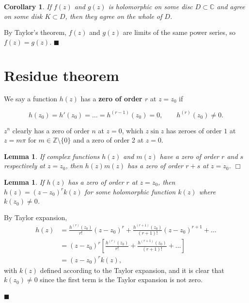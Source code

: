 \documentclass[letter-paper]{tufte-book}
\newtheorem{lemma}[theorem]{\color{pastel-blue}Lemma}
\newtheorem{corollary}[theorem]{\color{pastel-blue}Corollary}
\newenvironment{proof}[1][Proof]{\begin{trivlist}
\item[\hskip \labelsep {\bfseries #1}]}{\end{trivlist}}
\newenvironment{example}[1][Example]{\begin{trivlist}
\item[\hskip \labelsep {\bfseries #1}]}{\end{trivlist}}
\newcommand\Def[1]{\textbf{#1}}
\newcommand{\qed}{\hfill$\blacksquare$}
\newcommand{\qedwhite}{\hfill \ensuremath{\Box}}
\begin{document}
\begin{corollary}
  If $f(z)$ and $g(z)$ is holomorphic on some disc $D \subset \mathbb{C}$ and
  agree on some disk $K \subset D$, then they agree on the whole of $D$.
\end{corollary}
\begin{proof}
  By Taylor's theorem, $f(z)$ and $g(z)$ are limits of the same power series, so
  $f(z) = g(z)$. \qed
\end{proof}


\section{Residue theorem}

We say a function $h(z)$ has a \Def{zero of order $r$} at $z=z_0$ if

\begin{equation*}
  h(z_0) = h'(z_0) = \ldots = h^{(r-1)}(z_0) = 0, \qquad h^{(r)}(z_0) \neq 0.
\end{equation*}

\begin{example}
  $z^n$ clearly has a zero of order $n$ at $z = 0$, which $z \sin z$ has zeroes
  of order $1$ at $z = m \pi$ for $m \in \mathbb{Z} \setminus \{0\}$ and a zero
  of order 2 at $z = 0$.
\end{example}

\begin{lemma}
  If complex functions $h(z)$ and $m(z)$ have a zero of order $r$ and $s$
  respectively at $z=z_0$, then $h(z)m(z)$ has a zero of order $r + s$ at
  $z=z_0$. \qedwhite {}
\end{lemma}

\begin{lemma}
  If $h(z)$ has a zero of order $r$ at $z=z_0$, then $h(z) = (z-z_0)^r k(z)$ for
  some holomorphic function $k(z)$ where $k(z_0) \neq 0$.
\end{lemma}

\begin{proof}
  By Taylor expansion,
  \begin{align*}
    h(z) &= \frac{h^{(r)}(z_0)}{r!} (z-z_0)^r + \frac{h^{(r+1)}(z_0)}{(r+1)!} (z-z_0)^{r+1} + \ldots\\
      &= (z-z_0)^r \left[\frac{h^{(r)}(z_0)}{r!} + \frac{h^{(r+1)}(z_0)}{(r+1)!} + \ldots\right]\\
      &=(z-z_0)^r k(z),
  \end{align*}
  with $k(z)$ defined according to the Taylor expansion, and it is clear that
  $k(z_0) \neq 0$ since the first term is the Taylor expansion is not zero. 
  
  \qed
\end{proof}
\end{document}
